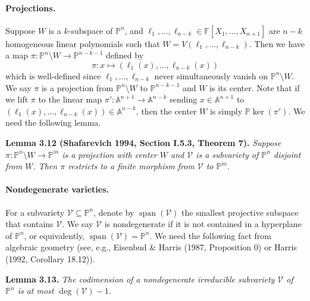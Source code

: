 \documentclass[10pt,a4paper]{article}
\newcommand{\FF}{\mathbb F}
\newcommand{\PP}{\mathbb P}
\newcommand{\Aspace}{\mathbb A}
\newenvironment{result}[1]{\par\medskip\noindent\textbf{#1.}\itshape}{\par\medskip}
\begin{document}
\paragraph{Projections.}
Suppose $W$ is a $k$-subspace of $\PP^n$, and $\ell_1,\ldots,\ell_{n-k}\in\FF[X_1,\ldots,X_{n+1}]$ are $n-k$ homogeneous linear polynomials such that $W=V(\ell_1,\ldots,\ell_{n-k})$. Then we have a map $\pi:\PP^n\setminus W\to\PP^{n-k-1}$ defined by
\[\pi:x\mapsto(\ell_1(x),\ldots,\ell_{n-k}(x))\]
which is well-defined since $\ell_1,\ldots,\ell_{n-k}$ never simultaneously vanish on $\PP^n\setminus W$. We say $\pi$ is a projection from $\PP^n\setminus W$ to $\PP^{n-k-1}$ and $W$ is its center. Note that if we lift $\pi$ to the linear map $\pi':\Aspace^{n+1}\to\Aspace^{n-k}$ sending $x\in\Aspace^{n+1}$ to $(\ell_1(x),\ldots,\ell_{n-k}(x))\in\Aspace^{n-k}$, then the center $W$ is simply $\PP\ker(\pi')$.
We need the following lemma.
\begin{result}{Lemma 3.12 (Shafarevich 1994, Section I.5.3, Theorem 7)}
Suppose $\pi:\PP^n\setminus W\to\PP^m$ is a projection with center $W$ and $\mathcal V$ is a subvariety of $\PP^n$ disjoint from $W$. Then $\pi$ restricts to a finite morphism from $\mathcal V$ to $\PP^m$.
\end{result}
\paragraph{Nondegenerate varieties.}
For a subvariety $\mathcal V\subseteq\PP^n$, denote by $\operatorname{span}(\mathcal V)$ the smallest projective subspace that contains $\mathcal V$. We say $\mathcal V$ is nondegenerate if it is not contained in a hyperplane of $\PP^n$, or equivalently, $\operatorname{span}(\mathcal V)=\PP^n$.
We need the following fact from algebraic geometry (see, e.g., Eisenbud \& Harris (1987, Proposition 0) or Harris (1992, Corollary 18.12)).
\begin{result}{Lemma 3.13}
The codimension of a nondegenerate irreducible subvariety $\mathcal V$ of $\PP^n$ is at most $\deg(\mathcal V)-1$.
\end{result}
\end{document}
